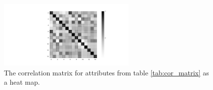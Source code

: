 \begin{figure}[H]
    \centering
    \includegraphics[width=0.6\textwidth]{fig/cor_matrix.pdf}
    \caption{The correlation matrix for attributes from table \ref{tab:cor_matrix} as a heat map.}
    \label{fig:cor_matrix}
\end{figure}
